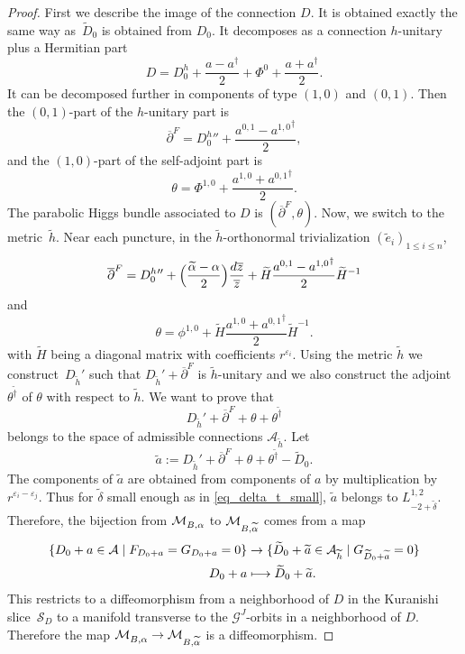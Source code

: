 \documentclass[11pt]{article}
\newcommand\mto{\mathchoice{\longmapsto}{\mapsto}{\mapsto}{\mapsto}}
\newcommand{\NoChangel}[1]{%
\expandafter\let\csname old\string#1\endcsname=#1
\let#1=\relax
\newcommand{#1}{\mathcode`l="716C\csname old\string#1\endcsname\mathcode`l="7160 }%
}
\newcommand{\Dol}{\mathrm{Dol}}\NoChangel{\Dol}
\let\epsilon\varepsilon
\theoremstyle{definition}
\theoremstyle{plain}
\newcommand{\inv}{^{-1}}
\begin{document}
\begin{proof}
First we describe the image of the connection $D$. It is obtained exactly the same way as~$\widetilde{D}_0$ is obtained from $D_0$. It decomposes as a connection $h$-unitary plus a Hermitian part
\[
D= D_{0}^h+ \frac{a-a^{\dagger}}{2} + \Phi^0 +\frac{a + a^{\dagger}}{2}.
\]
It can be decomposed further in components of type $(1,0)$ and $(0,1)$. Then the $(0,1)$-part of the $h$-unitary part is
\[
\overline{\partial}^F={D_{0}^h}{}''+ \frac{a^{0,1}-{a^{1,0}}^{\dagger}}{2},
\]
and the $(1,0)$-part of the self-adjoint part is
\[
\theta = \Phi^{1,0} + \frac{a^{1,0}+{a^{0,1}}^{\dagger}}{2}.
\]
The parabolic Higgs bundle associated to $D$ is $(\overline{\partial}^F,\theta)$. Now, we switch to the metric~$\widetilde{h}$. Near each puncture, in the $\widetilde{h}$-orthonormal trivialization $(\widetilde{e}_i)_{1\le i\le n}$,
\[
\overline{\partial}^F= {D_{0}^h}{}'' +\Bigl(\frac{\widetilde{\alpha}-\alpha}{2}\Bigr)\frac{d\overline{z}}{\overline{z}} + \widetilde{H} \frac{a^{0,1}-{a^{1,0}}^{\dagger}}{2} \widetilde{H} \inv
\]
and
\[
\theta = \phi^{1,0} + \widetilde{H}\frac{a^{1,0}+{a^{0,1}}^{\dagger}}{2} \widetilde{H}\inv.
\]
with $\widetilde{H}$ being a diagonal matrix with coefficients $r^{\epsilon_i}$. Using the metric $\widetilde{h}$ we construct~$D_{\widetilde{h}}'$ such that $D_{\widetilde{h}}'+\overline{\partial}^F$ is $\widetilde{h}$-unitary and we also construct the adjoint $\theta^{\widetilde{\dagger}}$ of $\theta$ with respect to $\widetilde{h}$. We want to prove that
\[
D_{\widetilde{h}}'+\overline{\partial}^F+\theta + \theta^{\widetilde{\dagger}}
\]
belongs to the space of admissible connections $\mathcal{A}_{\widetilde{h}}$. Let
\[
\widetilde{a}:=D_{\widetilde{h}}'+\overline{\partial}^F+\theta + \theta^{\widetilde{\dagger}} - \widetilde{D}_0.
\]
The components of $\widetilde{a}$ are obtained from components of $a$ by multiplication by $r^{\epsilon_i-\epsilon_j}$. Thus for $\widetilde{\delta}$ small enough as in \eqref{eq_delta_t_small}, $\widetilde{a}$ belongs to $L^{1,2}_{-2+\widetilde{\delta}}$. Therefore, the bijection from $\mathcal{M}^{\Dol}_{B,\alpha}$ to $\mathcal{M}^{\Dol}_{B,\widetilde{\alpha}}$ comes from a map
\begin{align*}
\lbrace D_0 + a \in \mathcal{A} \mid F_{D_0+a} = G_{D_0+a}= 0\rbrace & \to\lbrace \widetilde{D}_0 + \widetilde{a} \in \mathcal{A}_{\widetilde{h}} \mid G_{\widetilde{D}_0 + \widetilde{a}}= 0\rbrace \\
D_0 + a & \mto \widetilde{D}_0 + \widetilde{a}.
\end{align*}
This restricts to a diffeomorphism from a neighborhood of $D$ in the Kuranishi slice~$\mathcal{S}_D$ to a manifold transverse to the $\mathcal{G}^J$-orbits in a neighborhood of $D$. Therefore the map $\mathcal{M}_{B,\alpha}^{\Dol}\to \mathcal{M}_{B,\widetilde{\alpha}}^{\Dol}$ is a diffeomorphism.
\end{proof}
\end{document}
